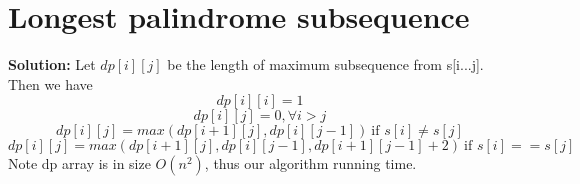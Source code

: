 

\section{Longest palindrome subsequence}
{\bf Solution:} Let $dp[i][j]$ be the length of maximum subsequence from s[i...j]. Then we have 
\[ dp[i][i]=1 \]
\[ dp[i][j]=0, \forall i > j \]
\[ dp[i][j] = max(dp[i+1][j], dp[i][j-1]) \ \text{if } s[i]\ne s[j] \]
\[ dp[i][j] = max(dp[i+1][j], dp[i][j-1], dp[i+1][j-1]+2)\ \text{if }  s[i] == s[j]\]
Note dp array is in size $O(n^2)$, thus our algorithm running time.